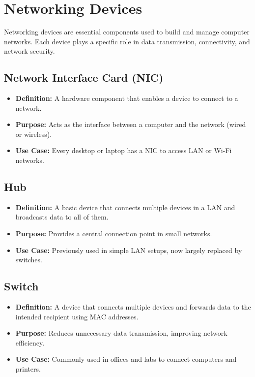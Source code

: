 \section{Networking Devices}

Networking devices are essential components used to build and manage computer networks. Each device plays a specific role in data transmission, connectivity, and network security.

\subsection{Network Interface Card (NIC)}
\begin{itemize}[leftmargin=1.5cm]
  \item \textbf{Definition:} A hardware component that enables a device to connect to a network.
  \item \textbf{Purpose:} Acts as the interface between a computer and the network (wired or wireless).
  \item \textbf{Use Case:} Every desktop or laptop has a NIC to access LAN or Wi-Fi networks.
\end{itemize}

\subsection{Hub}
\begin{itemize}[leftmargin=1.5cm]
  \item \textbf{Definition:} A basic device that connects multiple devices in a LAN and broadcasts data to all of them.
  \item \textbf{Purpose:} Provides a central connection point in small networks.
  \item \textbf{Use Case:} Previously used in simple LAN setups, now largely replaced by switches.
\end{itemize}

\subsection{Switch}
\begin{itemize}[leftmargin=1.5cm]
  \item \textbf{Definition:} A device that connects multiple devices and forwards data to the intended recipient using MAC addresses.
  \item \textbf{Purpose:} Reduces unnecessary data transmission, improving network efficiency.
  \item \textbf{Use Case:} Commonly used in offices and labs to connect computers and printers.
\end{itemize}

